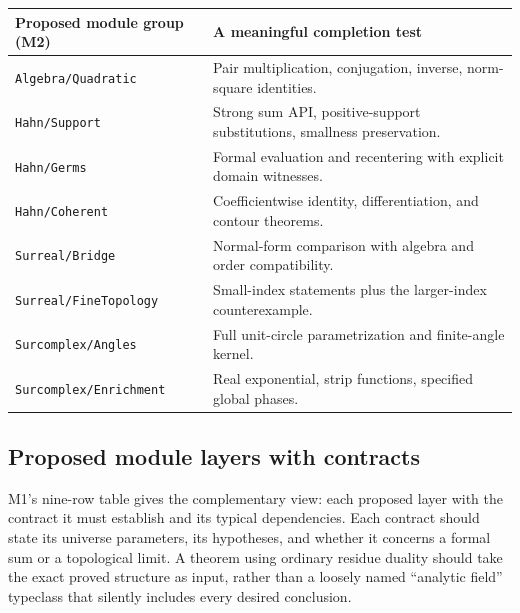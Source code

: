 \documentclass[11pt,letterpaper]{article}
\numberwithin{equation}{section}
\theoremstyle{definition}
\theoremstyle{remark}
\begin{document}
\begin{center}\small
\begin{tabular}{@{}P{0.28\textwidth}P{0.63\textwidth}@{}}
\toprule
Proposed module group (M2) & A meaningful completion test\\\midrule
\texttt{Algebra/Quadratic} & Pair multiplication, conjugation, inverse, norm-square identities.\\
\texttt{Hahn/Support} & Strong sum API, positive-support substitutions, smallness preservation.\\
\texttt{Hahn/Germs} & Formal evaluation and recentering with explicit domain witnesses.\\
\texttt{Hahn/Coherent} & Coefficientwise identity, differentiation, and contour theorems.\\
\texttt{Surreal/Bridge} & Normal-form comparison with algebra and order compatibility.\\
\texttt{Surreal/FineTopology} & Small-index statements plus the larger-index counterexample.\\
\texttt{Surcomplex/Angles} & Full unit-circle parametrization and finite-angle kernel.\\
\texttt{Surcomplex/Enrichment} & Real exponential, strip functions, specified global phases.\\
\bottomrule
\end{tabular}
\end{center}

\subsection{Proposed module layers with contracts}
\label{found:sub:contracts}
M1's nine-row table gives the complementary view: each proposed layer with the
contract it must establish and its typical dependencies. Each contract should
state its universe parameters, its hypotheses, and whether it concerns a formal
sum or a topological limit. A theorem using ordinary residue duality should take
the exact proved structure as input, rather than a loosely named ``analytic
field'' typeclass that silently includes every desired conclusion.
\end{document}
